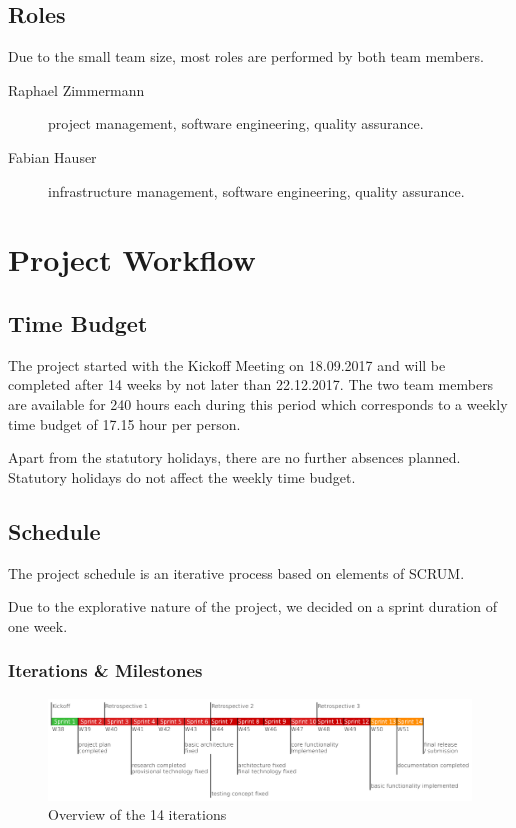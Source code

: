 \documentclass[a4paper]{article}
\begin{document}
\subsection{Roles}

Due to the small team size, most roles are performed by both team members.

\begin{description}
	\item[Raphael Zimmermann] project management, software engineering, quality assurance.
	\item[Fabian Hauser] infrastructure management, software engineering, quality assurance.
\end{description}

\section{Project Workflow}
\subsection{Time Budget}

The project started with the Kickoff  Meeting on 18.09.2017 and will be completed after 14 weeks by not later than 22.12.2017.
The two team members are available for 240 hours each during this period which corresponds to a weekly time budget of 17.15 hour per person.

Apart from the statutory holidays, there are no further absences planned. Statutory holidays do not affect the weekly time budget.

\subsection{Schedule}
The project schedule is an iterative process based on elements of SCRUM. 

Due to the explorative nature of the project, we decided on a sprint duration of one week.
\subsubsection{Iterations \& Milestones}

\begin{figure}
	\centering
	\includegraphics[width=1\linewidth]{resources/overview}
	\caption{Overview of the 14 iterations}
	\label{fig:overview}
\end{figure}
\end{document}
